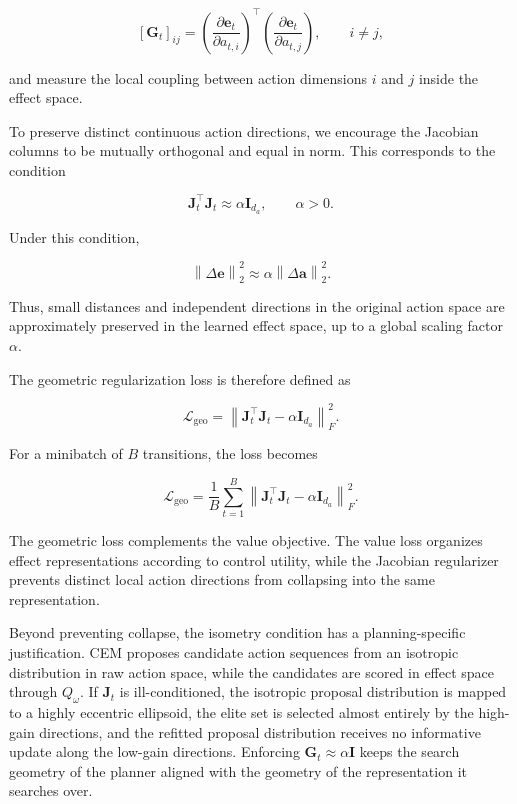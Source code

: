 ﻿\documentclass{article}
\begin{document}
\[
[\mathbf{G}_t]_{ij}
=
\left(
\frac{\partial \mathbf{e}_t}
{\partial a_{t,i}}
\right)^{\top}
\left(
\frac{\partial \mathbf{e}_t}
{\partial a_{t,j}}
\right),
\qquad
i \neq j,
\]

and measure the local coupling between action dimensions \(i\) and \(j\)
inside the effect space.

To preserve distinct continuous action directions, we encourage the
Jacobian columns to be mutually orthogonal and equal in norm. This
corresponds to the condition

\[
\mathbf{J}_t^{\top}\mathbf{J}_t
\approx
\alpha \mathbf{I}_{d_a},
\qquad
\alpha > 0.
\]

Under this condition,

\[
\left\|
\Delta \mathbf{e}
\right\|_2^2
\approx
\alpha
\left\|
\Delta \mathbf{a}
\right\|_2^2.
\]

Thus, small distances and independent directions in the original action
space are approximately preserved in the learned effect space, up to a
global scaling factor \(\alpha\).

The geometric regularization loss is therefore defined as

\[
\mathcal{L}_{\mathrm{geo}}
=
\left\|
\mathbf{J}_t^{\top}\mathbf{J}_t
-
\alpha \mathbf{I}_{d_a}
\right\|_F^2.
\]

For a minibatch of \(B\) transitions, the loss becomes

\[
\mathcal{L}_{\mathrm{geo}}
=
\frac{1}{B}
\sum_{t=1}^{B}
\left\|
\mathbf{J}_t^{\top}\mathbf{J}_t
-
\alpha \mathbf{I}_{d_a}
\right\|_F^2.
\]

The geometric loss complements the value objective. The value loss
organizes effect representations according to control utility, while the
Jacobian regularizer prevents distinct local action directions from
collapsing into the same representation.

Beyond preventing collapse, the isometry condition has a planning-specific
justification. CEM proposes candidate action sequences from an isotropic
distribution in raw action space, while the candidates are scored in effect
space through \(Q_{\omega}\). If \(\mathbf{J}_t\) is ill-conditioned, the
isotropic proposal distribution is mapped to a highly eccentric ellipsoid,
the elite set is selected almost entirely by the high-gain directions, and
the refitted proposal distribution receives no informative update along the
low-gain directions. Enforcing \(\mathbf{G}_t \approx \alpha \mathbf{I}\)
keeps the search geometry of the planner aligned with the geometry of the
representation it searches over.
\end{document}
